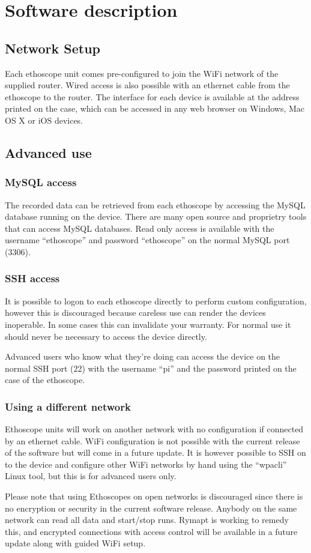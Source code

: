 \chapter{Software description}\label{ch:software}

\section{Network Setup}\label{ch:network}
Each ethoscope unit comes pre-configured to join the WiFi network of the supplied router. Wired
access is also possible with an ethernet cable from the ethoscope to the router. The interface
for each device is available at the address printed on the case, which can be accessed in any web
browser on Windows, Mac OS X or iOS devices.

\section{Advanced use}\label{ch:advanced}
\subsection{MySQL access}\label{ch:mysql}
The recorded data can be retrieved from each ethoscope by accessing the MySQL database running on
the device. There are many open source and proprietry tools that can access MySQL databases. Read
only access is available with the username ``ethoscope'' and password ``ethoscope'' on the normal MySQL
port (3306).

\subsection{SSH access}\label{ch:mysql}
It is possible to logon to each ethoscope directly to perform custom configuration, however this is
discouraged because careless use can render the devices inoperable. In some cases this can invalidate
your warranty. For normal use it should never be necessary to access the device directly.

Advanced users who know what they're doing can access the device on the normal SSH port (22) with
the username ``pi'' and the password printed on the case of the ethoscope.

\subsection{Using a different network}\label{ch:mysql}
Ethoscope units will work on another network with no configuration if connected by an ethernet cable.
WiFi configuration is not possible with the current release of the software but will come in a
future update. It is however possible to SSH on to the device and configure other WiFi networks by
hand using the ``wpa\textunderscore{}cli'' Linux tool, but this is for advanced users only.

Please note that using Ethoscopes on open networks is discouraged since there is no encryption or
security in the current software release. Anybody on the same network can read all data and
start/stop runs. Rymapt is working to remedy this, and encrypted connections with access control
will be available in a future update along with guided WiFi setup.
